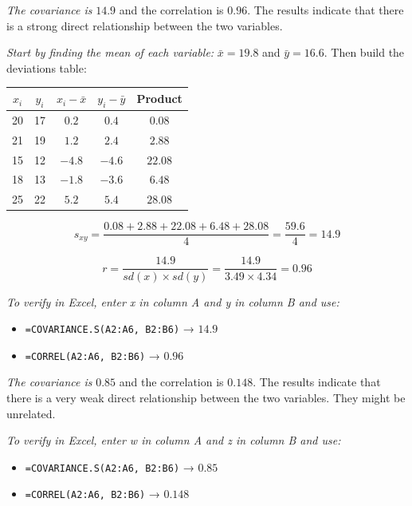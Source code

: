 \documentclass[
  11pt,
  letterpaper,
  DIV=11,
  numbers=noendperiod,
  oneside,
  open=any]{scrreprt}
\providecommand{\tightlist}{%
  \setlength{\itemsep}{0pt}\setlength{\parskip}{0pt}}\usepackage{longtable,booktabs,array}
\newenvironment{bsanswerkey}[2]{%
  \begin{tcolorbox}[bsbase, colback=bspaper2, colframe=bsline, fontupper=\small,
    title={\hypertarget{a-#1}{}\label{a-#1}\hyperlink{q-#1}{\textcolor{bsink2}{\MakeUppercase{#2}}}\hfill
      \hyperlink{q-#1}{\textcolor{bsaccent}{\normalfont\footnotesize back to page \pageref{q-#1}}}}]}%
  {\end{tcolorbox}}
\begin{document}
\begin{bsanswerkey}{bsans49}{Exercise 1, question 1}

\emph{The covariance is} \(14.9\) and the correlation is \(0.96\). The
results indicate that there is a strong direct relationship between the
two variables.

\emph{Start by finding the mean of each variable:} \(\bar{x} = 19.8\)
and \(\bar{y} = 16.6\). Then build the deviations table:

\begin{center}
\begin{tabular}{ccccc}
\toprule
\(x_i\) & \(y_i\) & \(x_i-\bar{x}\) & \(y_i-\bar{y}\) & Product \\
\midrule
20 & 17 & \(0.2\) & \(0.4\) & \(0.08\) \\
21 & 19 & \(1.2\) & \(2.4\) & \(2.88\) \\
15 & 12 & \(-4.8\) & \(-4.6\) & \(22.08\) \\
18 & 13 & \(-1.8\) & \(-3.6\) & \(6.48\) \\
25 & 22 & \(5.2\) & \(5.4\) & \(28.08\) \\
\bottomrule
\end{tabular}
\end{center}

\[s_{xy} = \frac{0.08+2.88+22.08+6.48+28.08}{4} = \frac{59.6}{4} = 14.9\]

\[r = \frac{14.9}{sd(x) \times sd(y)} = \frac{14.9}{3.49 \times 4.34} = 0.96\]

\emph{To verify in Excel, enter x in column A and y in column B and
use:}

\begin{itemize}
\tightlist
\item
  \texttt{=COVARIANCE.S(A2:A6,\ B2:B6)} → \(14.9\)
\item
  \texttt{=CORREL(A2:A6,\ B2:B6)} → \(0.96\)
\end{itemize}

\end{bsanswerkey}

\begin{bsanswerkey}{bsans50}{Exercise 1, question 2}

\emph{The covariance is} \(0.85\) and the correlation is \(0.148\). The
results indicate that there is a very weak direct relationship between
the two variables. They might be unrelated.

\emph{To verify in Excel, enter w in column A and z in column B and
use:}

\begin{itemize}
\tightlist
\item
  \texttt{=COVARIANCE.S(A2:A6,\ B2:B6)} → \(0.85\)
\item
  \texttt{=CORREL(A2:A6,\ B2:B6)} → \(0.148\)
\end{itemize}

\end{bsanswerkey}
\end{document}
